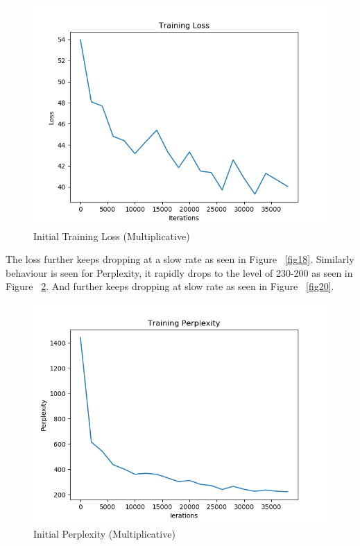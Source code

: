 \documentclass[11pt,a4paper]{article}
\begin{document}
\begin{figure}[!htbp]
\includegraphics[width=\linewidth]{de_mul_loss_1.png}
\caption{Initial Training Loss (Multiplicative)}
\label{fig17}
\end{figure}

The loss further keeps dropping at a slow rate as seen in Figure ~\ref{fig18}. Similarly behaviour is seen for Perplexity, it rapidly drops to the level of 230-200 as seen in Figure ~\ref{fig19}. And further keeps dropping at slow rate as seen in Figure ~\ref{fig20}.


\begin{figure}[!htbp]
\includegraphics[width=\linewidth]{de_mul_ppl_1.png}
\caption{Initial Perplexity (Multiplicative)}
\label{fig19}
\end{figure}
\end{document}
